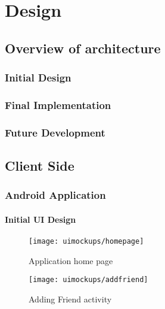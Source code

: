 \chapter{Design}



\section{Overview of architecture}

\subsection{Initial Design}

\subsection{Final Implementation}

\subsection{Future Development}





\section{Client Side}

\subsection{Android Application}

\subsubsection*{Initial UI Design}

\begin{figure}[p]
    \centering
    \texttt{[image: uimockups/homepage]}
    \caption{Application home page}
    \label{fig:application_home_page_image}
\end{figure}

\begin{figure}[p]
    \centering
    \texttt{[image: uimockups/addfriend]}
    \caption{Adding Friend activity}
    \label{fig:add_friend_activity_image}
\end{figure}

